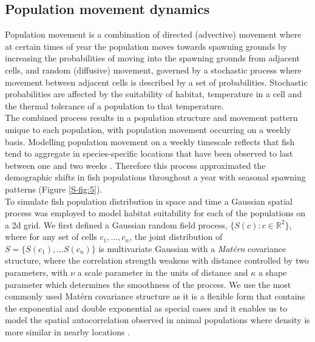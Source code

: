 \documentclass[preprint]{elsarticle}
\begin{document}
\subsection{Population movement dynamics}

Population movement is a combination of directed (advective) movement where at
certain times of year the population moves towards spawning grounds by
increasing the probabilities of moving into the spawning grounds from adjacent
cells, and random (diffusive) movement, governed by a stochastic process where
movement between adjacent cells is described by a set of probabilities.
Stochastic probabilities are affected by the suitability of habitat,
temperature in a cell and the thermal tolerance of a population to that
temperature.\\

The combined process results in a population structure and movement pattern
unique to each population, with population movement occurring on a weekly
basis. Modelling population movement on a weekly timescale reflects that fish
tend to aggregate in species-specific locations that have been observed to last
between one and two weeks \citep{Poos2007}. Therefore this process approximated
the demographic shifts in fish populations throughout a year with seasonal
spawning patterns (Figure \ref{S-fig:5}). \\

To simulate fish population distribution in space and time a Gaussian spatial
process was employed to model habitat suitability for each of the populations
on a 2d grid. We first defined a Gaussian random field process, $\{S(c) : c
\in \mathbb{R}^2\}$, where for any set of cells $c_{1}, \dots, c_{n}$, the
joint distribution of $S = \{S(c_{1}),\dots S(c_{n})\}$ is multivariate
Gaussian with a \textit{Matérn} covariance structure, where the correlation
strength weakens with distance controlled by two parameters, with $\nu$ a scale
parameter in the units of distance and $\kappa$ a shape parameter which
determines the smoothness of the process. We use the most commonly used Matérn
covariance structure as it is a flexible form that contains the exponential and
double exponential as special cases and it enables us to model the spatial
autocorrelation observed in animal populations where density is more similar in
nearby locations \citep{Tobler1970, F.Dormann2007, Poos2007}. \\ 
\end{document}
